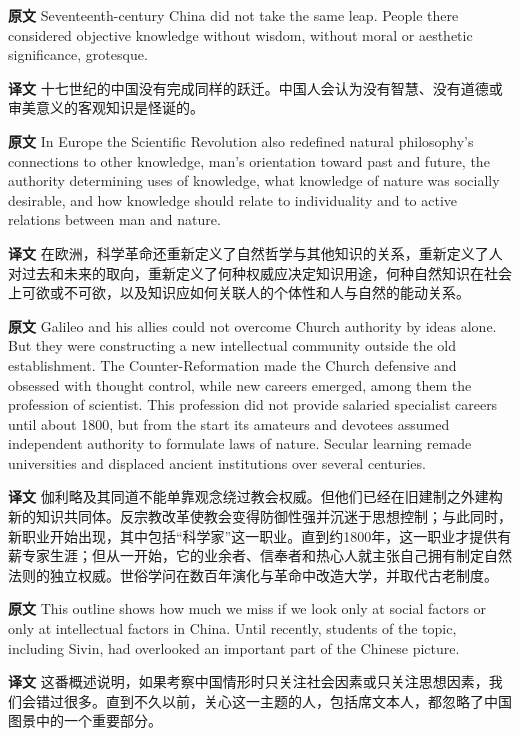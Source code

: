 \documentclass[UTF8,zihao=-4]{ctexart}
\newcommand{\BodyFont}{\fontsize{10.5pt}{15.5pt}\selectfont}
\newcommand{\origlabel}{\textbf{原文}\quad}
\newcommand{\translabel}{\textbf{译文}\quad}
\newenvironment{enblock}{\par\noindent\begingroup\BodyFont\origlabel}{\par\endgroup}
\newenvironment{zhblock}{\par\noindent\begingroup\BodyFont\translabel}{\par\endgroup\vspace{0.35em}}
\begin{document}
\begin{enblock}
Seventeenth-century China did not take the same leap. People there considered objective knowledge without wisdom, without moral or aesthetic significance, grotesque.
\end{enblock}
\begin{zhblock}
十七世纪的中国没有完成同样的跃迁。中国人会认为没有智慧、没有道德或审美意义的客观知识是怪诞的。
\end{zhblock}

\begin{enblock}
In Europe the Scientific Revolution also redefined natural philosophy's connections to other knowledge, man's orientation toward past and future, the authority determining uses of knowledge, what knowledge of nature was socially desirable, and how knowledge should relate to individuality and to active relations between man and nature.
\end{enblock}
\begin{zhblock}
在欧洲，科学革命还重新定义了自然哲学与其他知识的关系，重新定义了人对过去和未来的取向，重新定义了何种权威应决定知识用途，何种自然知识在社会上可欲或不可欲，以及知识应如何关联人的个体性和人与自然的能动关系。
\end{zhblock}

\begin{enblock}
Galileo and his allies could not overcome Church authority by ideas alone. But they were constructing a new intellectual community outside the old establishment. The Counter-Reformation made the Church defensive and obsessed with thought control, while new careers emerged, among them the profession of scientist. This profession did not provide salaried specialist careers until about 1800, but from the start its amateurs and devotees assumed independent authority to formulate laws of nature. Secular learning remade universities and displaced ancient institutions over several centuries.
\end{enblock}
\begin{zhblock}
伽利略及其同道不能单靠观念绕过教会权威。但他们已经在旧建制之外建构新的知识共同体。反宗教改革使教会变得防御性强并沉迷于思想控制；与此同时，新职业开始出现，其中包括“科学家”这一职业。直到约1800年，这一职业才提供有薪专家生涯；但从一开始，它的业余者、信奉者和热心人就主张自己拥有制定自然法则的独立权威。世俗学问在数百年演化与革命中改造大学，并取代古老制度。
\end{zhblock}

\begin{enblock}
This outline shows how much we miss if we look only at social factors or only at intellectual factors in China. Until recently, students of the topic, including Sivin, had overlooked an important part of the Chinese picture.
\end{enblock}
\begin{zhblock}
这番概述说明，如果考察中国情形时只关注社会因素或只关注思想因素，我们会错过很多。直到不久以前，关心这一主题的人，包括席文本人，都忽略了中国图景中的一个重要部分。
\end{zhblock}
\end{document}

